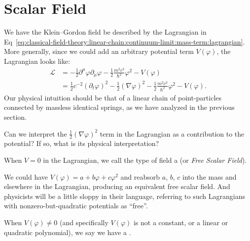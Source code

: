 \section{Scalar Field}

\M{}
We have the Klein--Gordon field
be described by the Lagrangian in
Eq~\eqref{eq:classical-field-theory:linear-chain:continuum-limit:mass-term:lagrangian}.
More generally, since we could add an arbitrary potential term
$V(\varphi)$, the Lagrangian looks like:
\begin{equation}\label{eq:classical-field-theory:scalar-field:lagrangian}
\begin{split}
  \mathcal{L} &= -\frac{1}{2}\partial^{\mu}\varphi\partial_{\mu}\varphi
-\frac{1}{2}\frac{m^{2}c^{2}}{\hbar^{2}}\varphi^{2} - V(\varphi)\\
&=\frac{1}{2}c^{-2}(\partial_{t}\varphi)^{2}-\frac{1}{2}(\nabla\varphi)^{2}
-\frac{1}{2}\frac{m^{2}c^{2}}{\hbar^{2}}\varphi^{2} - V(\varphi).
\end{split}
\end{equation}
Our physical intuition should be that of a linear chain of
point-particles connected by massless identical springs, as we have
analyzed in the previous section.

\begin{exercise}
Can we interpret the $\frac{1}{2}(\nabla\varphi)^{2}$ term in the
Lagrangian as a contribution to the potential? If so, what is its
physical interpretation?
\end{exercise}

\begin{definition}
When $V=0$ in the Lagrangian, we call the type of field a
 (or \emph{Free Scalar Field}).
\end{definition}

\begin{remark}
We could have $V(\varphi) = a + b\varphi + c\varphi^{2}$ and reabsorb
$a$, $b$, $c$ into the mass and elsewhere in the Lagrangian, producing
an equivalent free scalar field. And physicists will be a little sloppy
in their language, referring to such Lagrangians with
nonzero-but-quadratic potentials as ``free''.
\end{remark}

\begin{definition}
When $V(\varphi)\neq0$ (and specifically $V(\varphi)$ is not a constant,
or a linear or quadratic polynomial), we say we have a
.
\end{definition}

